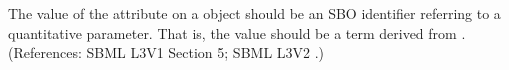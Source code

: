 The value of the attribute  on a \LocalParameter object should be
an SBO identifier referring to a quantitative parameter.  That is, the
value should be a term derived from \sboparameter.  (References: SBML L3V1 Section 5; SBML
 L3V2 .)
